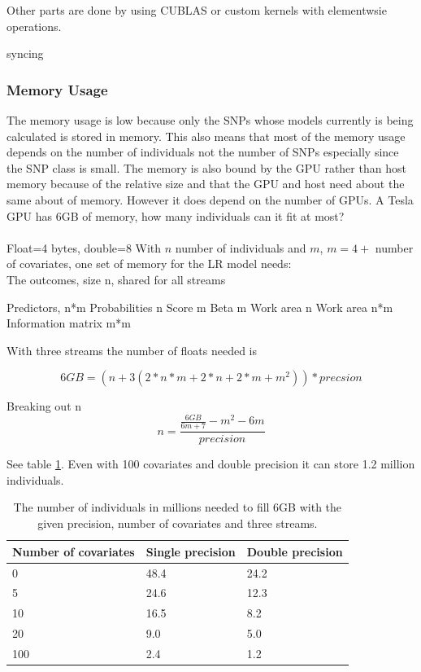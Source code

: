 \documentclass[10pt,a4paper]{report}
\begin{document}
Other parts are done by using CUBLAS or custom kernels with elementwsie operations.

syncing

\subsubsection{Memory Usage}
The memory usage is low because only the SNPs whose models currently is being calculated is stored in memory. This also means that most of the memory usage depends on the number of individuals not the number of SNPs especially since the SNP class is small. The memory is also bound by the GPU rather than host memory because of the relative size and that the GPU and host need about the same about of memory. However it does depend on the number of GPUs. A Tesla GPU has 6GB of memory\cite{nvtesla}, how many individuals can it fit at most?\\
\\
Float=4 bytes, double=8
With $n$ number of individuals and $m$, $m=4+$ number of covariates, one set of memory for the LR model needs:\\
The outcomes, size n, shared for all streams

Predictors, n*m
Probabilities n
Score m
Beta m
Work area n
Work area n*m
Information matrix m*m

With three streams the number of floats needed is

\begin{equation}
6GB=(n+3(2*n*m+2*n+2*m+m^2))*precsion
\end{equation}

Breaking out n
\begin{equation}
n=\frac{\frac{6GB}{6m+7}-m^2-6m}{precision}
\end{equation}

See table \ref{table:gpu_mem}. Even with 100 covariates and double precision it can store 1.2 million individuals.

\begin{table}[h]
\begin{tabular}{| l | l l |}
  \hline
  Number of covariates & Single precision & Double precision\\
  \hline
  0 & 48.4 & 24.2 \\
  5 & 24.6 & 12.3 \\
  10 & 16.5 & 8.2 \\
  20 & 9.0 & 5.0 \\
  100 & 2.4 & 1.2 \\
  \hline  
\end{tabular}
\caption{The number of individuals in millions needed to fill 6GB with the given precision, number of covariates and three streams.}
\label{table:gpu_mem}
\end{table}
\end{document}

